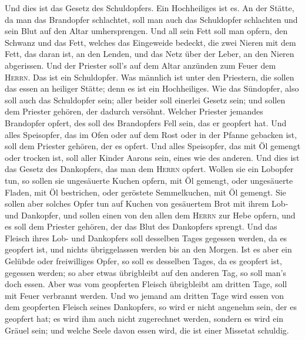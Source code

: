  Und dies ist das Gesetz des Schuldopfers. Ein
Hochheiliges ist es.  An der Stätte, da man das Brandopfer
schlachtet, soll man auch das Schuldopfer schlachten und sein Blut auf
den Altar umhersprengen.  Und all sein Fett soll man
opfern, den Schwanz und das Fett, welches das Eingeweide bedeckt,
 die zwei Nieren mit dem Fett, das daran ist, an den
Lenden, und das Netz über der Leber, an den Nieren abgerissen.
 Und der Priester soll's auf dem Altar anzünden zum Feuer
dem \textsc{Herrn}. Das ist ein Schuldopfer.  Was männlich
ist unter den Priestern, die sollen das essen an heiliger Stätte; denn
es ist ein Hochheiliges.  Wie das Sündopfer, also soll
auch das Schuldopfer sein; aller beider soll einerlei Gesetz sein; und
sollen dem Priester gehören, der dadurch versöhnt. 
Welcher Priester jemandes Brandopfer opfert, des soll des Brandopfers
Fell sein, das er geopfert hat.  Und alles Speisopfer, das
im Ofen oder auf dem Rost oder in der Pfanne gebacken ist, soll dem
Priester gehören, der es opfert.  Und alles Speisopfer,
das mit Öl gemengt oder trocken ist, soll aller Kinder Aarons sein,
eines wie des anderen.  Und dies ist das Gesetz des
Dankopfers, das man dem \textsc{Herrn} opfert.  Wollen
sie ein Lobopfer tun, so sollen sie ungesäuerte Kuchen opfern, mit Öl
gemengt, oder ungesäuerte Fladen, mit Öl bestrichen, oder geröstete
Semmelkuchen, mit Öl gemengt.  Sie sollen aber solches
Opfer tun auf Kuchen von gesäuertem Brot mit ihrem Lob- und Dankopfer,
 und sollen einen von den allen dem \textsc{Herrn} zur
Hebe opfern, und es soll dem Priester gehören, der das Blut des
Dankopfers sprengt.  Und das Fleisch ihres Lob- und
Dankopfers soll desselben Tages gegessen werden, da es geopfert ist, und
nichts übriggelassen werden bis an den Morgen.  Ist es
aber ein Gelübde oder freiwilliges Opfer, so soll es desselben Tages, da
es geopfert ist, gegessen werden; so aber etwas übrigbleibt auf den
anderen Tag, so soll man's doch essen.  Aber was vom
geopferten Fleisch übrigbleibt am dritten Tage, soll mit Feuer verbrannt
werden.  Und wo jemand am dritten Tage wird essen von dem
geopferten Fleisch seines Dankopfers, so wird er nicht angenehm sein,
der es geopfert hat; es wird ihm auch nicht zugerechnet werden, sondern
es wird ein Gräuel sein; und welche Seele davon essen wird, die ist
einer Missetat schuldig.

